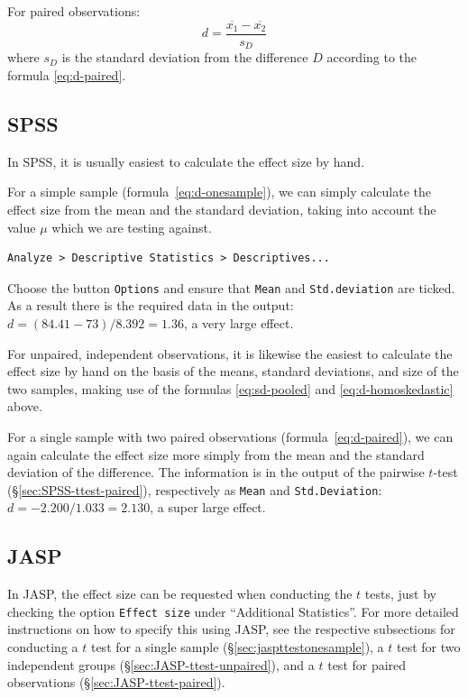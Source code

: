 \documentclass[
]{book}
\begin{document}
For paired observations:
\begin{equation}
  \label{eq:d-paired}
  d = \frac{ \overline{x_1}-\overline{x_2} } { s_D }
\end{equation}
where \(s_D\) is the
standard deviation from the difference \(D\) according
to the formula \eqref{eq:d-paired}.

\hypertarget{spss-13-2}{%
\subsection{SPSS}\label{spss-13-2}}

In SPSS, it is usually easiest to calculate the effect size
by hand.

For a simple sample
(formula~\eqref{eq:d-onesample}), we can simply calculate the
effect size from the mean and the standard deviation, taking into account
the value \(\mu\) which we are testing against.

\begin{verbatim}
Analyze > Descriptive Statistics > Descriptives...
\end{verbatim}

Choose the button \texttt{Options} and ensure that \texttt{Mean} and \texttt{Std.deviation} are
ticked. As a result there is the required data in the output:\\
\(d = (84.41 - 73) / 8.392 = 1.36\), a very large effect.

For unpaired, independent observations, it is likewise the easiest
to calculate the effect size by hand on the basis of the
means, standard deviations, and size of the two samples, making use
of the formulas
\eqref{eq:sd-pooled} and
\eqref{eq:d-homoskedastic} above.

For a single sample with two paired observations
(formula~\eqref{eq:d-paired}), we can again calculate the effect
size more simply from the mean and the standard deviation of the difference.
The information is in the output of the pairwise \(t\)-test\\
(§\ref{sec:SPSS-ttest-paired}), respectively as \texttt{Mean} and
\texttt{Std.Deviation}:\\
\(d = -2.200 / 1.033 = 2.130\), a super large effect.

\hypertarget{jasp-12}{%
\subsection{JASP}\label{jasp-12}}

In JASP, the effect size can be requested when conducting the \(t\) tests, just by checking the option \texttt{Effect\ size} under ``Additional Statistics''. For more detailed instructions on how to specify this using JASP, see the respective subsections for conducting a \(t\) test for a single sample (§\ref{sec:jaspttestonesample}), a \(t\) test for two independent groups (§\ref{sec:JASP-ttest-unpaired}), and a \(t\) test for paired observations (§\ref{sec:JASP-ttest-paired}).
\end{document}
